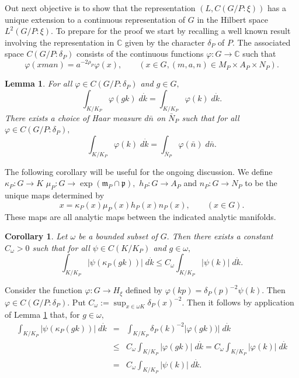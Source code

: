 \documentclass[12pt,a4paper]{article}
\newtheorem{Cor}[Thm]{Corollary}
\newtheorem{Lemma}[Thm]{Lemma}
\newenvironment{cor}[0]{\begin{Cor}\noindent}%
{\end{Cor}}
\newenvironment{lemma}[0]{\begin{Lemma}\noindent}%
{\end{Lemma}}
\def\proof{\par\noindent{\it Proof.}{\ }{\ }}
\def\qquad{\quad\quad}
\def\msy#1{{\mathbb #1}}
\def\C{{\msy C}}
\def\gd{\delta}
\def\gf{\varphi}
\def\got#1{\mathfrak #1}
\def\fm{{\got m}}
\def\fp{{\got p}}
\def\to{\rightarrow}
\numberwithin{Thm}{section}
\numberwithin{equation}{section}
\numberwithin{equation}{section}
\begin{document}
Out next objective is to show that the representation $(L, C(G/P:\xi))$ has a 
unique extension to a continuous representation of $G$ in 
the Hilbert space $L^2(G/P:\xi).$ To prepare for the proof we start by recalling a  well known result
involving the representation in $\C$ given by the character $\gd_P$ of $P$.
The associated space $C(G/P: \gd_P)$ consists
of the continuous functions $\gf: G \to \C$ such that  
$$ 
\gf(x man) = a^{- 2\rho_P} \gf(x), \qquad (x\in G, (m,a,n) \in M_P\times A_P \times N_P).
$$%
\begin{lemma}
\label{l: around gd P}
For all $\gf \in C(G/P:\gd_P)$ and $g \in G,$ 
$$ 
 \int_{K/K_P} \gf(g k)\; d\dot{k}  = \int_{K/K_P} \gf(k)\; d\dot{k} .
$$%
There exists a choice of Haar measure $d \bar n$ on $\bar N_P$ such that 
for all $\gf \in C(G/P:\gd_P),$ 
$$
\int_{K/K_P} \gf(k)\; d\dot{k} = \int_{\bar N_P} \gf(\bar n)\; d\bar n.
$$%
\end{lemma}

The following corollary will be useful for the ongoing discussion.
We define $\kappa_P: G\to K$ $\mu_P: G \to \exp(\fm_P \cap \fp),$ $h_P: G\to A_P$ and
$n_P: G \to N_P$  to be the unique maps determined by 
$$ 
x = \kappa_P(x) \mu_P(x) h_P(x) n_P(x), \qquad (x \in G).
$$%
These maps  are all analytic maps between the indicated analytic manifolds. 

\begin{cor}
\label{c: L one boundedness}
Let $\omega$ be a bounded subset of $G.$ Then there exists a constant $C_\omega > 0$ such that
for all $\psi \in C(K/K_P)$ and $g \in \omega,$ 
$$ 
\int_{K/K_P} |\psi (\kappa_P (g k))| \; d\dot k \leq C_\omega \int_{K/K_P} |\psi(k)|\;d\dot{k}.
$$%
\end{cor} 

\proof
Consider the function $\gf: G \to H_\xi$ defined by $\gf(kp) = \gd_P(p)^{-2}\psi(k).$ 
Then $\gf \in C(G/P: \gd_P).$ 
Put $C_\omega := \sup_{x \in \omega  K}  \gd_P(x)^{-2}.$
Then it follows by application of Lemma \ref{l: around gd P}   that, for $g \in \omega,$ 
\begin{eqnarray*}
\int_{K/K_P} |\psi (\kappa_P (g k))| \; d\dot{k} & = & 
\int_{K/K_P} \gd_P(k)^{-2} |\gf (g k))| \;d\dot{k}\\
&\leq&
C_\omega \int_{K/K_P} |\gf (g k)| \;d\dot{k}
= C_\omega \int_{K/K_P} |\gf(k)|\;d\dot k\\
&=& C_\omega \int_{K/K_P} |\psi(k)|\;d\dot k.
\end{eqnarray*}
 \vspace{-30pt}
 
\end{document}
